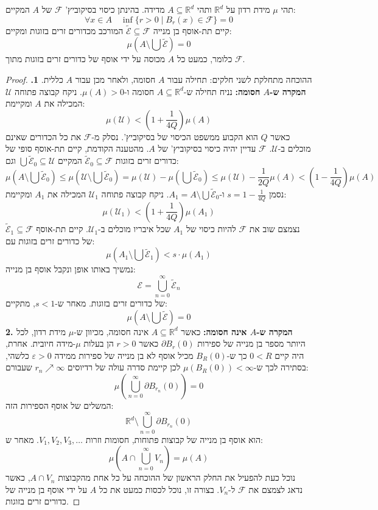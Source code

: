 \documentclass{tstextbook}
\begin{document}
\begin{corollary}
תהי \(\mu\) מידת רדון על \(\mathbb{R}^d\) ותהי \(A \subseteq \mathbb{R}^d\) מדידה. בהינתן כיסוי בסיקוביץ' \(\mathcal{F}\) של \(A\) המקיים:
$$ \forall x \in A \quad \inf\{r > 0 \mid B_r(x) \in \mathcal{F}\} = 0 $$
קיים תת-אוסף בן מנייה \(\widetilde{\mathcal{E}} \subseteq \mathcal{F}\) המורכב מכדורים זרים בזוגות ומקיים:
$$ \mu\left( A \setminus \bigcup \widetilde{\mathcal{E}} \right) = 0 $$
כלומר, כמעט כל \(A\) מכוסה על ידי אוסף של כדורים זרים בזוגות מתוך \(\mathcal{F}\).

\end{corollary}
\begin{proof}
ההוכחה מתחלקת לשני חלקים: תחילה עבור \(A\) חסומה, ולאחר מכן עבור \(A\) כללית.
\textbf{1. המקרה ש-\(A\) חסומה:}
נניח תחילה ש-\(A \subseteq \mathbb{R}^d\) חסומה ו-\(\mu(A) > 0\). ניקח קבוצה פתוחה \(\mathcal{U}\) המכילה את \(A\) ומקיימת:
$$ \mu(\mathcal{U}) < \left(1 + \frac{1}{4Q}\right) \mu(A) $$
כאשר \(Q\) הוא הקבוע ממשפט הכיסוי של בסיקוביץ'. נסלק מ-\(\mathcal{F}\) את כל הכדורים שאינם מוכלים ב-\(\mathcal{U}\). \(\mathcal{F}\) עדיין יהיה כיסוי בסיקוביץ' של \(A\).
מהטענה הקודמת, קיים תת-אוסף סופי של כדורים זרים בזוגות \(\widetilde{\mathcal{E}}_0 \subseteq \mathcal{F}\) המקיים \(\bigcup \widetilde{\mathcal{E}}_0 \subseteq \mathcal{U}\) וגם:
$$ \mu\left( A \setminus \bigcup \widetilde{\mathcal{E}}_0 \right) \leq \mu\left( \mathcal{U} \setminus \bigcup \widetilde{\mathcal{E}}_0 \right) = \mu(\mathcal{U}) - \mu\left( \bigcup \widetilde{\mathcal{E}}_0 \right) \leq \mu(\mathcal{U}) - \frac{1}{2Q} \mu(A) < \left(1 - \frac{1}{4Q}\right) \mu(A) $$
נסמן \(s = 1 - \frac{1}{4Q}\) ו-\(A_1 = A \setminus \bigcup \widetilde{\mathcal{E}}_0\). ניקח קבוצה פתוחה \(\mathcal{U}_1\) המכילה את \(A_1\) ומקיימת:
$$ \mu(\mathcal{U}_1) < \left(1 + \frac{1}{4Q}\right) \mu(A_1) $$
נצמצם שוב את \(\mathcal{F}\) להיות כיסוי של \(A_1\) שכל איבריו מוכלים ב-\(\mathcal{U}_1\). קיים תת-אוסף \(\widetilde{\mathcal{E}}_1 \subseteq \mathcal{F}\) של כדורים זרים בזוגות עם:
$$ \mu\left( A_1 \setminus \bigcup \widetilde{\mathcal{E}}_1 \right) < s \cdot \mu(A_1) $$
נמשיך באותו אופן ונקבל אוסף בן מנייה:
$$ \mathcal{E} = \bigcup_{n=0}^{\infty} \widetilde{\mathcal{E}}_n $$
של כדורים זרים בזוגות. מאחר ש-\(s < 1\), מתקיים:
$$ \mu\left( A \setminus \bigcup \widetilde{\mathcal{E}} \right) = 0 $$\textbf{2. המקרה ש-\(A\) אינה חסומה:}
כאשר \(A \subseteq \mathbb{R}^d\) אינה חסומה, מכיוון ש-\(\mu\) מידת רדון, לכל היותר מספר בן מנייה של ספירות \(\partial B_r(0)\) כאשר \(r > 0\) הן בעלות \(\mu\)-מידה חיובית. אחרת, היה קיים \(0 < R\) כך ש-\(B_R(0)\) מכיל אוסף לא בן מנייה של ספירות ממידה \(\varepsilon > 0\) כלשהי, בסתירה לכך ש-\(\mu(B_R(0)) < \infty\)
לכן קיימת סדרה עולה של רדיוסים \(r_n \nearrow \infty\) שעבורם:
$$ \mu\left( \bigcup_{n=0}^{\infty} \partial B_{r_n}(0) \right) = 0 $$
המשלים של אוסף הספירות הזה:
$$ \mathbb{R}^d \setminus \bigcup_{n=0}^{\infty} \partial B_{r_n}(0) $$
הוא אוסף בן מנייה של קבוצות פתוחות, חסומות וזרות \(V_1, V_2, V_3, \dots\). מאחר ש:
$$ \mu\left( A \cap \bigcup_{n=0}^{\infty} V_n \right) = \mu(A) $$
נוכל כעת להפעיל את החלק הראשון של ההוכחה על כל אחת מהקבוצות \(A \cap V_n\), כאשר נדאג לצמצם את \(\mathcal{F}\) ל-\(V_n\). בצורה זו, נוכל לכסות כמעט את כל \(A\) על ידי אוסף בן מנייה של כדורים זרים בזוגות.

\end{proof}
\end{document}
